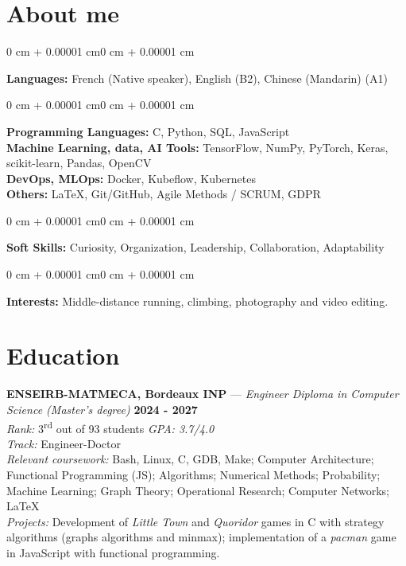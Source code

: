 \documentclass[10pt, letterpaper]{article}
\newenvironment{onecolentry}{
    \begin{adjustwidth}{0 cm + 0.00001 cm}{0 cm + 0.00001 cm}
}{
    \end{adjustwidth}
}
\begin{document}
\section{About me}
    \begin{onecolentry}
        \textbf{Languages:} French (Native speaker), English (B2), Chinese (Mandarin) (A1)
    \end{onecolentry}
\vspace{0.1 cm}
\begin{onecolentry}
    \textbf{Programming Languages:} C, Python, SQL, JavaScript \\
    \textbf{Machine Learning, data, AI Tools:} TensorFlow, NumPy, PyTorch, Keras, scikit-learn, Pandas, OpenCV \\
    \textbf{DevOps, MLOps:} Docker, Kubeflow, Kubernetes \\
    \textbf{Others:} LaTeX, Git/GitHub, Agile Methods / SCRUM, GDPR
\end{onecolentry}
\vspace{0.1 cm}
\begin{onecolentry}
    \textbf{Soft Skills:} Curiosity, Organization, Leadership, Collaboration, Adaptability
\end{onecolentry}
\vspace{0.1 cm}
    \begin{onecolentry}
        \textbf{Interests:} Middle-distance running, climbing, photography and video editing.
    \end{onecolentry}


\vspace{0.3cm}
\section*{Education}

\textbf{ENSEIRB-MATMECA, Bordeaux INP} — \textit{Engineer Diploma in Computer Science (Master's degree)} \hfill \textbf{2024 - 2027} \\
\textit{Rank:} 3\textsuperscript{rd} out of 93 students \hfill \textit{GPA: 3.7/4.0} \\
\textit{Track:} Engineer-Doctor\\
\textit{Relevant coursework:} Bash, Linux, C, GDB, Make; Computer Architecture; Functional Programming (JS); Algorithms; Numerical Methods; Probability; Machine Learning; Graph Theory; Operational Research; Computer Networks; LaTeX\\
\textit{Projects:} Development of \textit{Little Town} and \textit{Quoridor} games in C with strategy algorithms (graphs algorithms and minmax); implementation of a \textit{pacman} game in JavaScript with functional programming.
\end{document}
